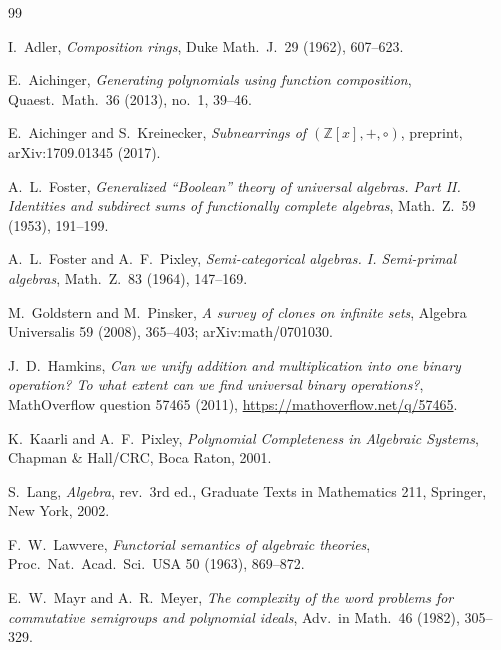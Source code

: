 \documentclass[11pt]{article}
\theoremstyle{definition}
\theoremstyle{remark}
\newcommand{\Z}{\mathbb{Z}}
\begin{document}
\begin{thebibliography}{99}

 I.~Adler, \emph{Composition rings}, Duke Math.\ J.\
29 (1962), 607--623.

 E.~Aichinger, \emph{Generating polynomials
using function composition}, Quaest.\ Math.\ 36 (2013), no.~1,
39--46.

 E.~Aichinger and S.~Kreinecker,
\emph{Subnearrings of $(\Z[x], +, \circ)$}, preprint,
arXiv:1709.01345 (2017).

 A.~L.~Foster, \emph{Generalized ``Boolean'' theory
of universal algebras.  Part II.  Identities and subdirect sums of
functionally complete algebras}, Math.\ Z.\ 59 (1953), 191--199.

 A.~L.~Foster and A.~F.~Pixley,
\emph{Semi-categorical algebras.  I.  Semi-primal algebras}, Math.\
Z.\ 83 (1964), 147--169.

\bibitem{GoldsternPinsker} M.~Goldstern and M.~Pinsker, \emph{A
survey of clones on infinite sets}, Algebra Universalis 59 (2008),
365--403; arXiv:math/0701030.

 J.~D.~Hamkins, \emph{Can we unify addition and
multiplication into one binary operation?  To what extent can we
find universal binary operations?}, MathOverflow question 57465
(2011), \url{https://mathoverflow.net/q/57465}.

 K.~Kaarli and A.~F.~Pixley, \emph{Polynomial
Completeness in Algebraic Systems}, Chapman \& Hall/CRC, Boca Raton,
2001.

 S.~Lang, \emph{Algebra}, rev.\ 3rd ed., Graduate Texts
in Mathematics 211, Springer, New York, 2002.

 F.~W.~Lawvere, \emph{Functorial semantics of
algebraic theories}, Proc.\ Nat.\ Acad.\ Sci.\ USA 50 (1963),
869--872.

 E.~W.~Mayr and A.~R.~Meyer, \emph{The complexity
of the word problems for commutative semigroups and polynomial
ideals}, Adv.\ in Math.\ 46 (1982), 305--329.


\end{thebibliography}
\end{document}
